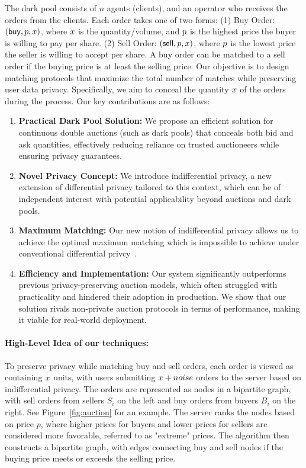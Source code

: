 The dark pool consists of $n$ agents (clients), and an operator who receives the orders from the clients. Each order takes one of two forms: (1) Buy Order: $({\sf buy}, {p}, x)$, where $x$ is the quantity/volume, and ${p}$ is the highest price the buyer is willing to pay per share.
(2) Sell Order: $({\sf sell}, {p}, x)$, where ${p}$ is the lowest price the seller is willing to accept per share. A buy order can be matched to a sell order if the buying
price is at least the selling price. Our objective is to design matching protocols that maximize the total number of matches while preserving user data privacy. Specifically, we aim to conceal the quantity $x$ of the orders during the process. Our key contributions are as follows:
\begin{enumerate}
    \item {\bf Practical Dark Pool Solution:} We propose an efficient solution for continuous double auctions (such as dark pools) that conceals both bid and ask quantities, effectively reducing reliance on trusted auctioneers while ensuring privacy guarantees.
    \item {\bf Novel Privacy Concept:} We introduce indifferential privacy, a new extension of differential privacy tailored to this context, which can be of independent interest with potential applicability beyond auctions and dark pools.
    \item {\bf Maximum Matching:} Our new notion of indifferential privacy allows us to achieve the optimal maximum matching which is impossible to achieve under conventional differential privcy~\cite{DBLP:journals/siamcomp/HsuHRRW16}. 
     \item {\bf Efficiency and Implementation: } Our system significantly outperforms previous privacy-preserving auction models, which often struggled with practicality and hindered their adoption in production. We show that our solution rivals non-private auction protocols in terms of performance, making it viable for real-world deployment. 
\end{enumerate}

\paragraph{High-Level Idea of our techniques:} To preserve privacy while matching buy and sell orders, each order is viewed as containing 
$x$ units, with users submitting 
$x+ noise$  orders to the server based on indifferential privacy. The orders are represented as nodes in a bipartite graph, with sell orders from sellers $S_i$ on the left and buy orders from buyers $B_i$ on the right. See Figure~\ref{fig:auction} for an example. The server ranks the nodes based on price $p$, where higher prices for buyers and lower prices for sellers are considered more favorable, referred to as "extreme" prices. The algorithm then constructs a bipartite graph, with edges connecting buy and sell nodes if the buying price meets or exceeds the selling price. 


